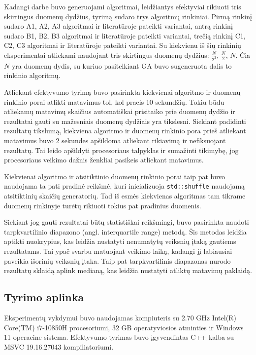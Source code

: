 \documentclass{VUMIFInfBakalaurinis}
\begin{document}
Kadangi darbe buvo generuojami algoritmai, leidžiantys efektyviai rikiuoti tris skirtingus duomenų dydžius, tyrimą sudaro trys algoritmų rinkiniai.
Pirmą rinkinį sudaro A1, A2, A3 algoritmai ir literatūroje pateikti variantai, antrą rinkinį sudaro B1, B2, B3 algoritmai ir literatūroje pateikti variantai,
trečią rinkinį C1, C2, C3 algoritmai ir literatūroje pateikti variantai.
Su kiekvienu iš šių rinkinių eksperimentai atliekami naudojant tris skirtingus duomenų dydžius: $\frac{N}{2^2}$, $\frac{N}{2}$, $N$.
Čia $N$ yra duomenų dydis, su kuriuo pasitelkiant GA buvo sugeneruota dalis to rinkinio algoritmų.

Atliekant efektyvumo tyrimą buvo pasirinkta kiekvienai algoritmo ir duomenų rinkinio porai
atlikti matavimus tol, kol praeis 10 sekundžių.
Tokiu būdu atliekamų matavimų skaičius automatiškai prisitaiko prie duomenų dydžio
ir rezultatai gauti su mažesniais duomenų dydžiais yra tikslesni.
Siekiant padidinti rezultatų tikslumą, kiekviena algoritmo ir duomenų rinkinio pora
prieš atliekant matavimus buvo 2 sekundes apšildoma atliekant rikiavimą ir nefiksuojant rezultatų.
Tai leido apšildyti procesoriaus talpyklas ir sumažinti tikimybę,
jog procesoriaus veikimo dažnis ženkliai pasikeis atliekant matavimus.

Kiekvienai algoritmo ir atsitiktinio duomenų rinkinio porai taip pat buvo naudojama ta pati pradinė reikšmė,
kuri inicializuoja \verb|std::shuffle| naudojamą atsitiktinių skaičių generatorių.
Tad iš esmės kiekvienas algoritmas tam tikrame duomenų rinkinyje turėtų rikiuoti tokius pat pradinius duomenis.

Siekiant jog gauti rezultatai būtų statistiškai reikšmingi, buvo pasirinkta naudoti tarpkvartilinio diapazono (angl. interquartile range) metodą.
Šis metodas leidžia aptikti nuokrypius, kas leidžia nustatyti nenumatytų veiksnių įtaką gautiems rezultatams.
Tai ypač svarbu matuojant veikimo laiką, kadangi jį labiausiai paveikia išorinių veiksnių įtaka.
Taip pat tarpkvartilinis diapazonas nurodo rezultatų sklaidą aplink medianą,
kas leidžia nustatyti atliktų matavimų paklaidą.

\subsection{Tyrimo aplinka}

Eksperimentų vykdymui buvo naudojamas kompiuteris su 2.70 GHz Intel(R) Core(TM) i7-10850H procesoriumi,
32 GB operatyviosios atminties ir Windows 11 operacine sistema.
Efektyvumo tyrimas buvo įgyvendintas C++ kalba su MSVC 19.16.27043 kompiliatoriumi.
\end{document}
